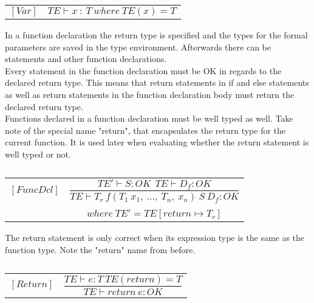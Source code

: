 \begin{table}[H]
    \begin{center}
    \begin{longtable}[c] { r c }
        $[Var]$ 
        & 
        \( {TE \vdash x\ :\ T}\ where\ {TE(x) = T} \)
    \end{longtable}
    \caption{}\label{type:var-ref}
        \end{center}
\end{table}
In a function declaration the return type is specified and the types for the formal parameters are saved in the type environment. Afterwards there can be statements and other function declarations. \\
Every statement in the function declaration must be OK in regards to the declared return type. This means that return statements in if and else statements as well as return statements in the function declaration body must return the declared return type. \\ 
Functions declared in a function declaration must be well typed as well.
Take note of the special name "return", that encapsulates the return type for the current function. It is used later when evaluating whether the return statement is well typed or not.
\begin{table}[H]
    \begin{center}
    \begin{longtable}[c] { r c }
        $[FuncDcl]$ 
        & 
        \( \dfrac{TE' \vdash S : OK \ \ TE \vdash D_{f}: OK} 
        {T E \vdash T_r \ f(T_1 \ x_1,\ ...,\ T_n,\ x_n)\ S\ D_f : OK} \) 
        \\ \\
        & 
        \( {where \ TE' = TE[return \mapsto T_r]} \)
    \end{longtable}
    \caption{}
        \end{center}
\end{table}

The return statement is only correct when its expression type is the same as the function type. Note the "return" name from before.
\begin{table}[H]
    \begin{center}
    \begin{longtable}[c] { r c }
        $[Return]$ 
        & 
        \( \dfrac{T E  \vdash e  :  T\ TE(return) = T}{T E \vdash return \ e : OK} \)

    \end{longtable}
    \caption{}
        \end{center}
\end{table}

